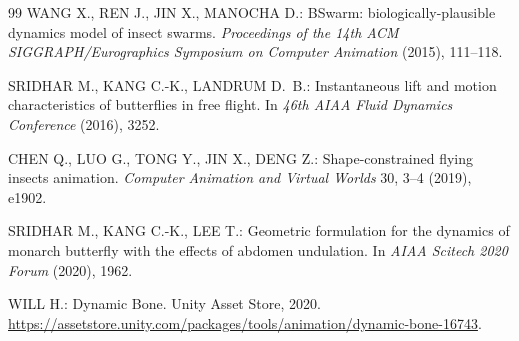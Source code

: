 \documentclass[12pt]{article}
\begin{document}
\begin{thebibliography}{99}
WANG X., REN J., JIN X., MANOCHA D.:
BSwarm: biologically-plausible dynamics model of insect swarms.
\textit{Proceedings of the 14th ACM SIGGRAPH/Eurographics Symposium on
Computer Animation} (2015), 111--118.

SRIDHAR M., KANG C.-K., LANDRUM D.~B.:
Instantaneous lift and motion characteristics of butterflies in free flight.
In \textit{46th AIAA Fluid Dynamics Conference} (2016), 3252.

CHEN Q., LUO G., TONG Y., JIN X., DENG Z.:
Shape-constrained flying insects animation.
\textit{Computer Animation and Virtual Worlds} 30, 3--4 (2019), e1902.

SRIDHAR M., KANG C.-K., LEE T.:
Geometric formulation for the dynamics of monarch butterfly with the effects
of abdomen undulation.
In \textit{AIAA Scitech 2020 Forum} (2020), 1962.

WILL H.:
Dynamic Bone.
Unity Asset Store, 2020.
\url{https://assetstore.unity.com/packages/tools/animation/dynamic-bone-16743}.

\end{thebibliography}
\end{document}
